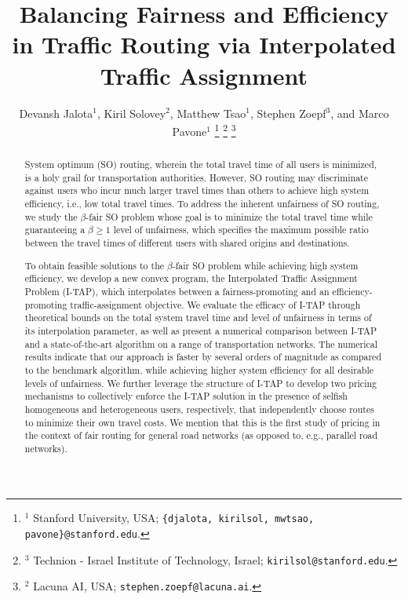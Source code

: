 \documentclass{article}
\title{Balancing Fairness and Efficiency in Traffic Routing via Interpolated Traffic Assignment}
\author{Devansh Jalota$^1$, Kiril Solovey$^2$, Matthew Tsao$^1$, Stephen Zoepf$^3$, and Marco Pavone$^1$%
\thanks{$^1$ Stanford University, USA; {\tt \{djalota, kirilsol, mwtsao, pavone\}@stanford.edu}.}%
\thanks{$^3$ Technion - Israel Institute of Technology, Israel;
{\tt kirilsol@stanford.edu}.}
\thanks{$^2$ Lacuna AI, USA; {\tt stephen.zoepf@lacuna.ai}.}%
}
\date{}
\begin{document}
\maketitle


\begin{abstract}
    System optimum (SO) routing, wherein the total travel time of all users is minimized, is a holy grail for transportation authorities. However, SO routing may discriminate against users who incur much larger travel times than others to achieve high system efficiency, i.e., low total travel times. To address the inherent unfairness of SO routing, we study the ${\beta}$-fair SO problem whose goal is to minimize the total travel time while guaranteeing a ${\beta\geq 1}$ level of unfairness, which specifies the maximum possible ratio between the travel times of different users with shared origins and destinations. 

    To obtain feasible solutions to the ${\beta}$-fair SO problem while achieving high system efficiency, we develop a new convex program, the Interpolated Traffic Assignment Problem (I-TAP), which interpolates between a fairness-promoting and an efficiency-promoting traffic-assignment objective. We evaluate the efficacy of I-TAP through theoretical bounds on the total system travel time and level of unfairness in terms of its interpolation parameter, as well as present a numerical comparison between I-TAP and a state-of-the-art algorithm on a range of transportation networks. The numerical results indicate that our approach is faster by several orders of magnitude as compared to the benchmark algorithm, while achieving higher system efficiency for all desirable levels of unfairness. We further leverage the structure of I-TAP to develop two pricing mechanisms to collectively enforce the I-TAP solution in the presence of selfish homogeneous and heterogeneous users, respectively, that independently choose routes to minimize their own travel costs. We mention that this is the first study of pricing in the context of fair routing for general road networks (as opposed to, e.g., parallel road networks).
\end{abstract}
\end{document}
